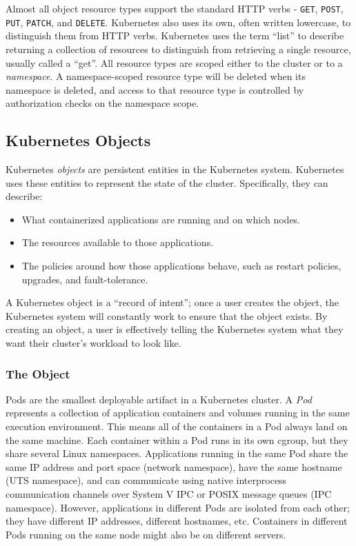 Almost all object resource types support the standard HTTP verbs - \texttt{GET},
\texttt{POST}, \texttt{PUT}, \texttt{PATCH}, and \texttt{DELETE}. Kubernetes
also uses its own, often written lowercase, to distinguish them from HTTP verbs.
Kubernetes uses the term ``list'' to describe returning a collection of
resources to distinguish from retrieving a single resource, usually called a
``get''. All resource types are scoped either to the cluster or to a
\textit{namespace}. A namespace-scoped resource type will be deleted when its
namespace is deleted, and access to that resource type is controlled by
authorization checks on the namespace scope.

\subsection{Kubernetes Objects}

Kubernetes \textit{objects} are persistent entities in the Kubernetes system.
Kubernetes uses these entities to represent the state of the cluster.
Specifically, they can describe:
\begin{itemize}
	\tightlist
	\item What containerized applications are running and on which nodes.
	\item The resources available to those applications.
	\item The policies around how those applications behave, such as restart
	      policies, upgrades, and fault-tolerance.
\end{itemize}

A Kubernetes object is a ``record of intent''; once a user creates the object,
the Kubernetes system will constantly work to ensure that the object exists. By
creating an object, a user is effectively telling the Kubernetes system what
they want their cluster's workload to look like.


\subsubsection{The  Object}\label{background:Pod}

Pods  are the smallest deployable artifact in a Kubernetes cluster. A
\textit{Pod} represents a collection of application containers and volumes
running in the same execution environment. This means all of the containers in a
Pod always land on the same machine. Each container within a Pod runs in its own
cgroup, but they share several Linux namespaces. Applications running in the
same Pod share the same IP address and port space (network namespace), have the
same hostname (UTS namespace), and can communicate using native interprocess
communication channels over System V IPC or POSIX message queues (IPC
namespace). However, applications in different Pods are isolated from each
other; they have different IP addresses, different hostnames, etc. Containers in
different Pods running on the same node might also be on different servers.


